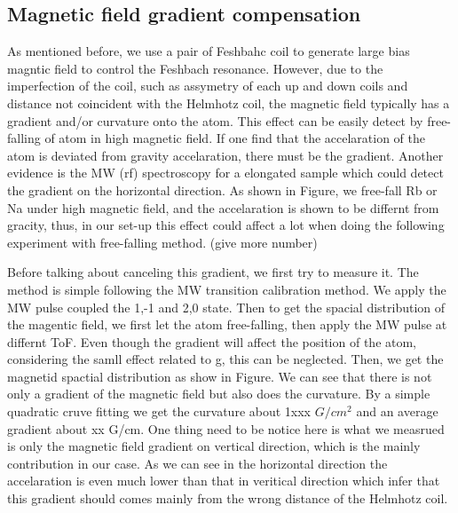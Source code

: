 \subsection{Magnetic field gradient compensation}
\label{subsec:gradientcompen}
As mentioned before, we use a pair of Feshbahc coil to generate large bias magntic field to control the Feshbach resonance. However, due to the imperfection of the coil, such as assymetry of each up and down coils and distance not coincident with the Helmhotz coil, the magnetic field typically has a gradient and/or curvature onto the atom. This effect can be easily detect by free-falling of atom in high magnetic field. If one find that the accelaration of the atom is deviated from gravity accelaration, there must be the gradient. Another evidence is the MW (rf) spectroscopy for a elongated sample which could detect the gradient on the horizontal direction. As shown in Figure, we free-fall Rb or Na under high magnetic field, and the accelaration is shown to be differnt from gracity, thus, in our set-up this effect could affect a lot when doing the following experiment with free-falling method. (give more number) 

Before talking about canceling this gradient, we first try to measure it. The method is simple following the MW transition calibration method. We apply the MW pulse coupled the 1,-1 and 2,0 state. Then to get the spacial distribution of the magentic field, we first let the atom free-falling, then apply the MW pulse at differnt ToF. Even though the gradient will affect the position of the atom, considering the samll effect related to g, this can be neglected. Then, we get the magnetid spactial distribution as show in Figure. We can see that there is not only a gradient of the magnetic field but also does the curvature. By a simple quadratic cruve fitting we get the curvature about 1xxx \(G/cm^2\) and an average gradient about xx G/cm. One thing need to be notice here is what we measrued is only the magnetic field gradient on vertical direction, which is the mainly contribution in our case. As we can see in the horizontal direction the accelaration is even much lower than that in veritical direction which infer that this gradient should comes mainly from the wrong distance of the Helmhotz coil.

